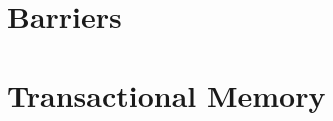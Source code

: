 \documentclass[letter,12pt]{report}
\begin{document}
\chapter{Barriers}







\chapter{Transactional Memory}





\end{document}

